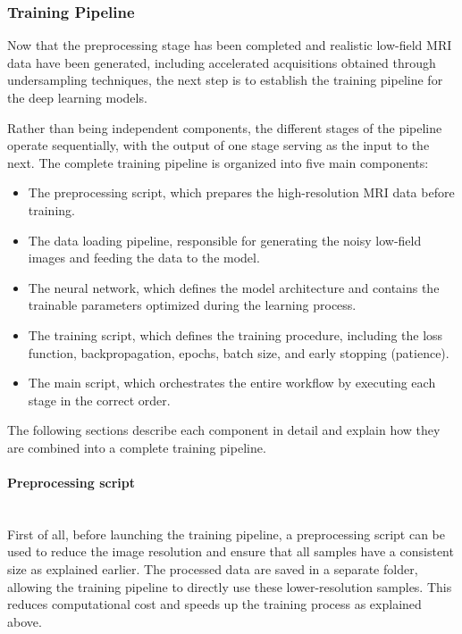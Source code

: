 \documentclass[12pt]{article}
\begin{document}
\subsubsection{Training Pipeline}

Now that the preprocessing stage has been completed and realistic low-field MRI data have been generated, including accelerated acquisitions obtained through undersampling techniques, the next step is to establish the training pipeline for the deep learning models.
\vspace{0.5cm}

Rather than being independent components, the different stages of the pipeline operate sequentially, with the output of one stage serving as the input to the next. 
The complete training pipeline is organized into five main components:

\begin{itemize}
    \item The preprocessing script, which prepares the high-resolution MRI data before training.
    \item The data loading pipeline, responsible for generating the noisy low-field images and feeding the data to the model.
    \item The neural network, which defines the model architecture and contains the trainable parameters optimized during the learning process.
    \item The training script, which defines the training procedure, including the loss function, backpropagation, epochs, batch size, and early stopping (patience).
    \item The main script, which orchestrates the entire workflow by executing each stage in the correct order.
\end{itemize}

The following sections describe each component in detail and explain how they are combined into a complete training pipeline.

\paragraph{Preprocessing script}
\mbox{}\\


First of all, before launching the training pipeline, a preprocessing script can be used to reduce the image resolution and ensure that all samples have
a consistent size as explained earlier. The processed data are saved in a separate folder, allowing the training pipeline to directly use these lower-resolution samples.
This reduces computational cost and speeds up the training process as explained above.
\vspace{0.5cm}
\end{document}

